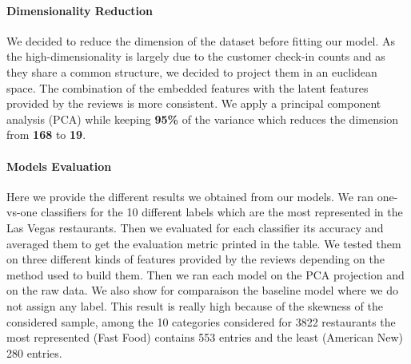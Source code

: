 \documentclass[twoside]{article}
\begin{document}
\begin{multicols}{2}
\paragraph{Dimensionality Reduction}

\noindent We decided to reduce the dimension of the dataset before fitting our model. As the high-dimensionality is largely due to the customer check-in counts and as they share a common structure, we decided to project them in an euclidean space. The combination of the embedded features with the latent features provided by the reviews is more consistent. We apply a principal component analysis (PCA) while keeping \textbf{95\%} of the variance which reduces the dimension from \textbf{168} to \textbf{19}.

\paragraph{Models Evaluation}

\noindent Here we provide the different results we obtained from our models. We ran one-vs-one classifiers for the 10 different labels which are the most represented in the Las Vegas restaurants. Then we evaluated for each classifier its accuracy and averaged them to get the evaluation metric printed in the table. We tested them on three different kinds of features provided by the reviews depending on the method used to build them. Then we ran each model on the PCA projection and on the raw data. We also show for comparaison the baseline model where we do not assign any label. This result is really high because of the skewness of the considered sample, among the 10 categories considered for 3822 restaurants the most represented (Fast Food) contains 553 entries and the least (American New) 280 entries.


\end{multicols}
\end{document}
